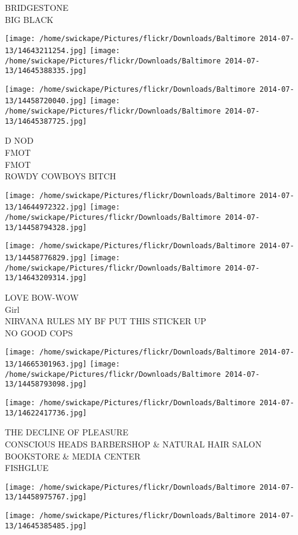 \documentclass[10pt,letterpaper]{article}
\begin{document}
BRIDGESTONE\\
BIG BLACK
\pagebreak

\texttt{[image: /home/swickape/Pictures/flickr/Downloads/Baltimore 2014-07-13/14643211254.jpg]}
\texttt{[image: /home/swickape/Pictures/flickr/Downloads/Baltimore 2014-07-13/14645388335.jpg]}

\texttt{[image: /home/swickape/Pictures/flickr/Downloads/Baltimore 2014-07-13/14458720040.jpg]}
\texttt{[image: /home/swickape/Pictures/flickr/Downloads/Baltimore 2014-07-13/14645387725.jpg]}

D NOD\\
FMOT\\
FMOT\\
ROWDY COWBOYS BITCH
\pagebreak

\texttt{[image: /home/swickape/Pictures/flickr/Downloads/Baltimore 2014-07-13/14644972322.jpg]}
\texttt{[image: /home/swickape/Pictures/flickr/Downloads/Baltimore 2014-07-13/14458794328.jpg]}

\texttt{[image: /home/swickape/Pictures/flickr/Downloads/Baltimore 2014-07-13/14458776829.jpg]}
\texttt{[image: /home/swickape/Pictures/flickr/Downloads/Baltimore 2014-07-13/14643209314.jpg]}

LOVE BOW{-}WOW\\
Girl\\
NIRVANA RULES MY BF PUT THIS STICKER UP\\
NO GOOD COPS
\pagebreak

\texttt{[image: /home/swickape/Pictures/flickr/Downloads/Baltimore 2014-07-13/14665301963.jpg]}
\texttt{[image: /home/swickape/Pictures/flickr/Downloads/Baltimore 2014-07-13/14458793098.jpg]}

\texttt{[image: /home/swickape/Pictures/flickr/Downloads/Baltimore 2014-07-13/14622417736.jpg]}

THE DECLINE OF PLEASURE\\
CONSCIOUS HEADS BARBERSHOP \& NATURAL HAIR SALON BOOKSTORE \& MEDIA CENTER\\
FISHGLUE
\pagebreak

\texttt{[image: /home/swickape/Pictures/flickr/Downloads/Baltimore 2014-07-13/14458975767.jpg]}

\vspace{0.25in}
\texttt{[image: /home/swickape/Pictures/flickr/Downloads/Baltimore 2014-07-13/14645385485.jpg]}
\end{document}
